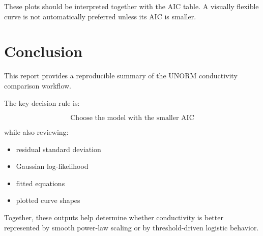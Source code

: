 \documentclass[11pt]{article}
\begin{document}
These plots should be interpreted together with the AIC table.  
A visually flexible curve is not automatically preferred unless its AIC is smaller.

\section{Conclusion}

This report provides a reproducible summary of the UNORM conductivity comparison workflow.

The key decision rule is:

\[
\text{Choose the model with the smaller AIC}
\]

while also reviewing:

\begin{itemize}[leftmargin=1.5em]
\item residual standard deviation
\item Gaussian log-likelihood
\item fitted equations
\item plotted curve shapes
\end{itemize}

Together, these outputs help determine whether conductivity is better represented by smooth power-law scaling or by threshold-driven logistic behavior.
\end{document}
